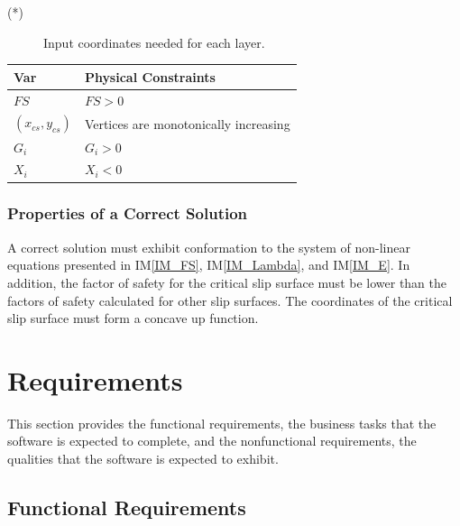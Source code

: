 \documentclass[12pt]{article}
\renewcommand{\arraystretch}{1}
\newcommand{\iref}[1]{IM\ref{#1}}
\begin{document}
\noindent \begin{description}
\item[(*)] Input coordinates needed for each layer.
\end{description}

\begin{table}[!h]
\caption{Output Variables} 
\renewcommand{\arraystretch}{1.2} 
\noindent \begin{longtable*}{l l} 
  \toprule \label{TblOutputVar}
  \textbf{Var} & \textbf{Physical Constraints} \\
  \midrule 
  $FS$ & $FS>0$ \\
  $(x_{cs},y_{cs})$ &  Vertices are monotonically increasing \\
  $G_i$ & $G_i>0$ \\
  $X_i$ & $X_i<0$ \\
  \bottomrule
\end{longtable*}
\end{table}

\subsubsection{Properties of a Correct Solution} \label{sec_CorrectSolution}

\noindent
A correct solution must exhibit conformation to the system of non-linear 
equations presented in \iref{IM_FS}, \iref{IM_Lambda}, and \iref{IM_E}. In 
addition, the factor of safety for the critical slip surface must be lower than 
the factors of safety calculated for other slip surfaces. The coordinates of 
the critical slip surface must form a concave up function.

\section{Requirements} \label{sec_Reqs}

This section provides the functional requirements, the business tasks
that the software is expected to complete, and the nonfunctional
requirements, the qualities that the software is expected to exhibit.

\subsection{Functional Requirements}
\end{document}
